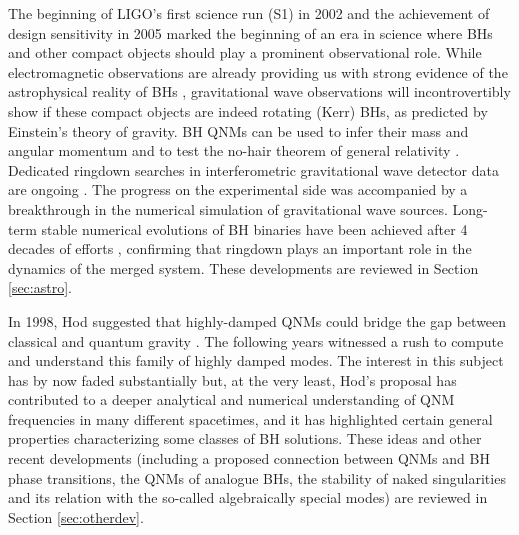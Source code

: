 \documentclass[]{iopart}
\begin{document}
  The beginning of LIGO's first science run (S1) in 2002 and the
achievement of design sensitivity in 2005 marked the beginning of an era in
science where BHs and other compact objects should play a prominent
observational role. While electromagnetic observations are already providing
us with strong evidence of the astrophysical reality of BHs
\cite{Narayan:2005ie}, gravitational wave observations will incontrovertibly
show if these compact objects are indeed rotating (Kerr) BHs, as predicted by
Einstein's theory of gravity. BH QNMs can be used to infer their mass and
angular momentum \cite{Echeverria:1989hg} and to test the no-hair theorem of
general relativity \cite{Berti:2005ys,Berti:2007zu}.  Dedicated ringdown
searches in interferometric gravitational wave detector data are ongoing
\cite{Creighton:1999pm,Tsunesada:2005fe}.  The progress on the experimental
side was accompanied by a breakthrough in the numerical simulation of
gravitational wave sources. Long-term stable numerical evolutions of BH
binaries have been achieved after 4 decades of efforts
\cite{Pretorius:2005gq,Campanelli:2005dd,Baker:2005vv}, confirming that
ringdown plays an important role in the dynamics of the merged system.
%
These developments are reviewed in Section \ref{sec:astro}.

 In 1998, Hod suggested that
highly-damped QNMs could bridge the gap between classical and quantum gravity
\cite{Hod:1998vk}. The following years witnessed a rush to compute and
understand this family of highly damped modes. The interest in this subject
has by now faded substantially but, at the very least, Hod's proposal has
contributed to a deeper analytical and numerical understanding of QNM
frequencies in many different spacetimes, and it has highlighted certain
general properties characterizing some classes of BH solutions. These ideas
and other recent developments (including a proposed connection between QNMs
and BH phase transitions, the QNMs of analogue BHs, the stability of naked
singularities and its relation with the so-called algebraically special modes)
are reviewed in Section \ref{sec:otherdev}.
\end{document}
